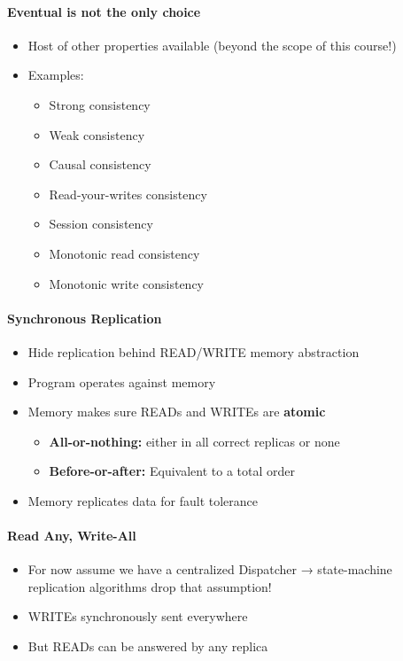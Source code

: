 \paragraph{Eventual is not the only choice}
\begin{itemize}
\item Host of other properties available
  (beyond the scope of this course!)
\item Examples:
  \begin{itemize}
  \item Strong consistency
  \item Weak consistency
  \item Causal consistency
  \item Read-your-writes consistency
  \item Session consistency
  \item Monotonic read consistency
  \item Monotonic write consistency
  \end{itemize}
\end{itemize}

\paragraph{Synchronous Replication}
\begin{itemize}
\item Hide replication behind READ/WRITE memory abstraction
\item Program operates against memory
\item Memory makes sure READs and WRITEs are \textbf{atomic}
  \begin{itemize}
  \item \textbf{All-or-nothing:} either in all correct replicas or none
  \item \textbf{Before-or-after:} Equivalent to a total order
  \end{itemize}
\item Memory replicates data for fault tolerance
\end{itemize}

\paragraph{Read Any, Write-All}

\begin{itemize}
\item For now assume we have a centralized Dispatcher
  → state-machine replication algorithms drop that assumption!
\item WRITEs synchronously sent everywhere
\item But READs can be answered by any replica
\end{itemize}

